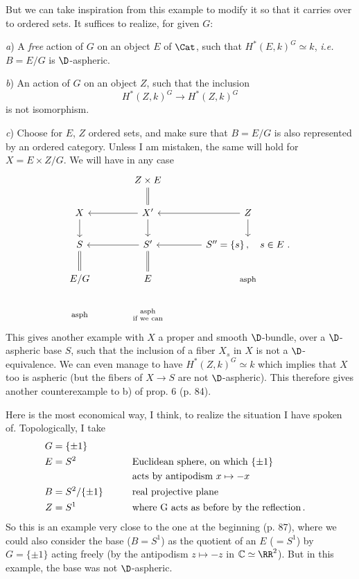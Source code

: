 
But we can take inspiration from this example to modify it so that it carries over to ordered sets. It suffices to realize, for given $G$:

\textit{a}) A \textit{free} action of $G$ on an object $E$ of $\Cat$, such that $H^*(E,k)^G \simeq k$, \textit{i.e.} $B = E/G$ is $\D$-aspheric.

\textit{b}) An action of $G$ on an object $Z$, such that the inclusion
\[ H^*(Z,k)^G \longrightarrow H^*(Z,k)^G \] %
is not isomorphism.

\textit{c}) Choose for $E$, $Z$ ordered sets, and make sure that $B = E/G$ is also represented by an ordered category. Unless I am mistaken, the same will hold for $X = E \times Z/G$. We will have in any case %
\[
\begin{tikzcd}[column sep=large]
 & Z \times E \arrow[d, equal] & \\
X \arrow[d] & X' \arrow[l] \arrow[d] & Z \arrow[l] \arrow[d] \\
S \arrow[d, equal] & S' \arrow[l] \arrow[d, equal] & S'' = \{s\}\, , \quad s \in E \ . \arrow[l] \\
E/G & E & \text{\footnotesize asph} \\
\text{\footnotesize asph} & \substack{\text{asph} \\ \text{if we can}} &
\end{tikzcd}
\]
This gives another example with $X$ a proper and smooth $\D$-bundle, over a $\D$-aspheric base $S$, such that the inclusion of a fiber $X_s$ in $X$ is not a $\D$-equivalence. We can even manage to have $H^*(Z,k)^G \simeq k$ which implies
that $X$ too is aspheric (but the fibers of $X \to S$ are not $\D$-aspheric). This therefore gives another counterexample to b) of prop. 6 (p. 84).

Here is the most economical way, I think, to realize the situation I have spoken of. Topologically, I take %
\[
\begin{aligned}
G &= \{\pm 1\} \\
E &= S^2 &\qquad& \text{Euclidean sphere, on which } \{\pm 1\} \\
  &      &&      \text{acts by antipodism } x \mapsto -x \\
B &= S^2/\{\pm 1\} && \text{real projective plane} \\
Z &= S^1 && \text{where G acts as before by the reflection\,.}
\end{aligned}
\]
So this is an example very close to the one at the beginning (p. 87), where we could also consider the base ($B = S^1$) as the quotient of an $E$ ($= S^1$) by $G = \{\pm 1\}$ acting freely (by
the antipodism $z \mapsto -z$ in $\mathbb{C} \simeq \RR^2$). But in this example, the base was not $\D$-aspheric.

